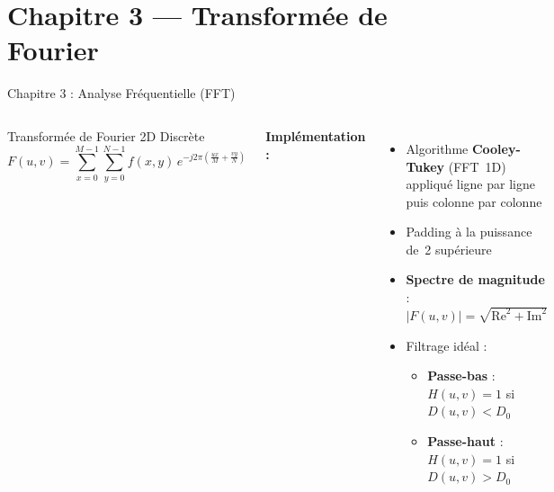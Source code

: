 \documentclass[aspectratio=169, 11pt]{beamer}
\begin{document}
\section{Chapitre 3 — Transformée de Fourier}

\begin{frame}{Chapitre 3 : Analyse Fréquentielle (FFT)}
  \begin{columns}[T]
    \begin{block}{Transformée de Fourier 2D Discrète}
      \[ F(u,v) = \sum_{x=0}^{M-1} \sum_{y=0}^{N-1} f(x,y)\, e^{-j2\pi\left(\frac{ux}{M} + \frac{vy}{N}\right)} \]
    \end{block}
    \vspace{4pt}
    \textbf{Implémentation :}
    \begin{itemize}
      \item Algorithme \textbf{Cooley-Tukey} (FFT~1D) appliqué ligne par ligne puis colonne par colonne
      \item Padding à la puissance de~2 supérieure
      \item \textbf{Spectre de magnitude} :
        $|F(u,v)| = \sqrt{\text{Re}^2 + \text{Im}^2}$
      \item Filtrage idéal :
        \begin{itemize}
          \item \textbf{Passe-bas} : $H(u,v) = 1$ si $D(u,v) < D_0$
          \item \textbf{Passe-haut} : $H(u,v) = 1$ si $D(u,v) > D_0$
        \end{itemize}
    \end{itemize}

  \end{columns}
\end{frame}
\end{document}
